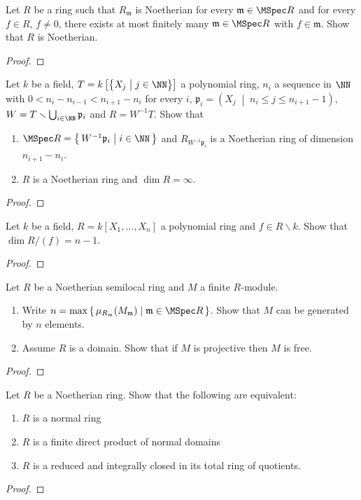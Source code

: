 \begin{problem}
Let $R$ be a ring such that $R_{\mathfrak{m}}$ is Noetherian for
every $\mathfrak{m}\in\MSpec R$ and for every $f\in R$, $f\neq
0$, there exists at most finitely many $\mathfrak{m}\in\MSpec R$
with $f\in\mathfrak{m}$. Show that $R$ is Noetherian.
\end{problem}
\begin{proof}
\end{proof}
\newpage
\begin{problem}
Let $k$ be a field, $T=k\left[\bigl\{X_j\;\middle|\;j\in\NN\bigr\}\right]$ a
polynomial ring, $n_i$ a sequence in $\NN$ with
$0<n_i-n_{i-1}<n_{i+1}-n_i$ for every $i$,
$\mathfrak{p}_i=\left(X_j\;\middle|\;n_i\leq j\leq
  n_{i+1}-1\right)$,
$W=T\smallsetminus\bigcup_{i\in\NN}\mathfrak{p}_i$ and
$R=W^{-1}T$. Show that
\begin{enumerate}[label=(\alph*)]
\item $\MSpec
  R=\left\{\,W^{-1}\mathfrak{p}_i\;\middle|\;i\in\NN\,\right\}$
  and $R_{W^{-1}\mathfrak{p}_i}$ is a Noetherian ring of
  dimension $n_{i+1}-n_i$.
\item $R$ is a Noetherian ring and $\dim R=\infty$.
\end{enumerate}
\end{problem}
\begin{proof}
\end{proof}
\newpage
\begin{problem}
Let $k$ be a field, $R=k[X_1,...,X_n]$ a polynomial ring and
$f\in R\smallsetminus k$. Show that $\dim R/(f)=n-1$.
\end{problem}
\begin{proof}
\end{proof}
\newpage
\begin{problem}
Let $R$ be a Noetherian semilocal ring and $M$ a finite
$R$-module.
\begin{enumerate}[label=(\alph*)]
\item Write
  $n=\max\left\{\,\mu_{R_{\mathfrak{m}}}(M_{\mathfrak{m}})\;\middle|\;\mathfrak{m}\in\MSpec
  R\,\right\}$. Show that $M$ can be generated by $n$ elements.
\item Assume $R$ is a domain. Show that if $M$ is projective then
  $M$ is free.
\end{enumerate}
\end{problem}
\begin{proof}
\end{proof}
\newpage
\begin{problem}
Let $R$ be a Noetherian ring. Show that the following are
equivalent:
\begin{enumerate}[label=(\roman*)]
\item $R$ is a normal ring
\item $R$ is a finite direct product of normal domains
\item $R$ is a reduced and integrally closed in its total ring of
  quotients.
\end{enumerate}
\end{problem}
\begin{proof}
\end{proof}


